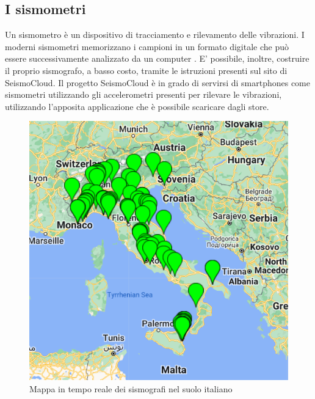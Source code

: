\documentclass[main.tex]{subfiles}
\begin{document}
\subsection{I sismometri}
Un sismometro è un dispositivo di tracciamento e rilevamento delle vibrazioni. I moderni sismometri memorizzano i campioni in un formato digitale che può essere successivamente analizzato da un computer \cite{Seismometer}. E' possibile, inoltre, costruire il proprio sismografo, a basso costo, tramite le istruzioni presenti sul sito di SeismoCloud.\newline
Il progetto SeismoCloud è in grado di servirsi di smartphones come sismometri utilizzando gli accelerometri presenti per rilevare le vibrazioni, utilizzando l'apposita applicazione che è possibile scaricare dagli store.
\begin{figure}[H]
    \centering
    \includegraphics[width=1\linewidth]{img/introduzione/realtimemap2.png}
    \caption{Mappa in tempo reale dei sismografi nel suolo italiano}
    \label{fig:real-time-map}
\end{figure}
\end{document}
